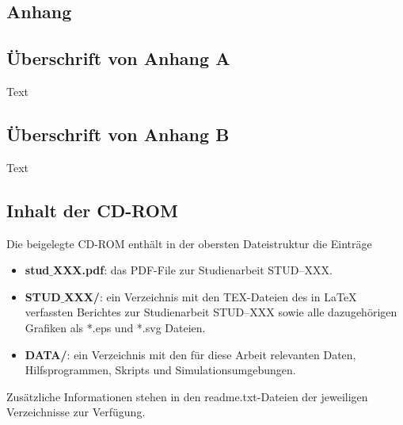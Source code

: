 %
%
\begin{appendix}
\chapter*{Anhang}
\setcounter{chapter}{1}

\section{Überschrift von Anhang A}
Text

\section{Überschrift von Anhang B}
Text

\pagebreak
\section{Inhalt der CD-ROM}
%
%
Die beigelegte CD-ROM enthält in der obersten Dateistruktur die Einträge
\begin{itemize}
\item \textbf{stud$\_${XXX}.pdf}: das PDF-File zur Studienarbeit
STUD--{XXX}.
%
\item \textbf{STUD$\_${XXX}/}: ein Verzeichnis mit den TEX-Dateien des in
LaTeX verfassten Berichtes zur Studienarbeit STUD--{XXX} sowie alle
dazugehörigen Grafiken als *.eps und *.svg Dateien.
% 
\item \textbf{DATA/}: ein Verzeichnis mit den für diese Arbeit
relevanten Daten, Hilfsprogrammen, Skripts und Simulationsumgebungen.
%
\end{itemize} 
Zusätzliche Informationen stehen in den readme.txt-Dateien der
jeweiligen Verzeichnisse zur Verfügung.

\end{appendix}
